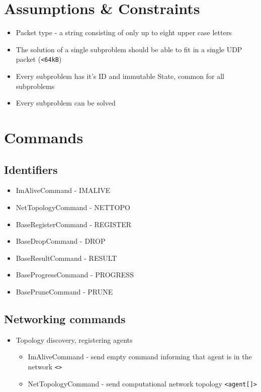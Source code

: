\documentclass{article}
\begin{document}
\section{Assumptions \& Constraints}
\begin{itemize}
    \item Packet type - a string consisting of only up to eight upper case letters 
    \item The solution of a single subproblem should be able to fit in a single UDP packet (\verb!<64kB!)
    \item Every subproblem has it's ID and immutable State, common for all subproblems
    \item Every subproblem can be solved
\end{itemize}

\section{Commands}
\subsection{Identifiers}
\begin{itemize}
    \item ImAliveCommand - IMALIVE
    \item NetTopologyCommand - NETTOPO
    \item BaseRegisterCommand - REGISTER
    \item BaseDropCommand - DROP
    \item BaseResultCommand - RESULT
    \item BaseProgressCommand - PROGRESS
    \item BasePruneCommand - PRUNE
\end{itemize}
\subsection{Networking commands}
\begin{itemize}
    \item Topology discovery, registering agents
    \begin{itemize}
        \item ImAliveCommand - send empty command informing that agent is in the network \verb!<>!
        \item NetTopologyCommand - send computational network topology \verb!<agent[]>!
    \end{itemize}
\end{itemize}
\end{document}
